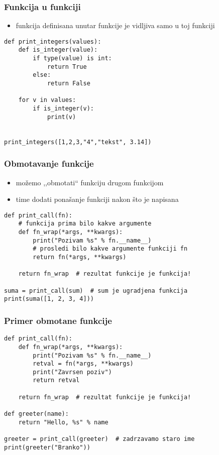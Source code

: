 \documentclass[utf8,compress,aspectratio=169]{beamer}
\begin{document}
\begin{frame}[fragile]
  \frametitle{Funkcija u funkciji}
  \begin{itemize}
    \item funkcija definisana unutar funkcije je vidljiva samo u toj funkciji
  \end{itemize}
\begin{verbatim}
def print_integers(values):
    def is_integer(value):
        if type(value) is int:
            return True
        else:
            return False

    for v in values:
        if is_integer(v):
            print(v)


print_integers([1,2,3,"4","tekst", 3.14])
\end{verbatim}
\end{frame}

\begin{frame}[fragile]
  \frametitle{Obmotavanje funkcije}
  \begin{itemize}
    \item možemo ,,obmotati`` funkciju drugom funkcijom
    \item time dodati ponašanje funkciji nakon što je napisana
  \end{itemize}
\begin{verbatim}
def print_call(fn):
    # funkcija prima bilo kakve argumente
    def fn_wrap(*args, **kwargs):
        print("Pozivam %s" % fn.__name__)
        # prosledi bilo kakve argumente funkciji fn
        return fn(*args, **kwargs)

    return fn_wrap  # rezultat funkcije je funkcija!

suma = print_call(sum)  # sum je ugradjena funkcija
print(suma([1, 2, 3, 4]))
\end{verbatim}
\end{frame}

\begin{frame}[fragile]
  \frametitle{Primer obmotane funkcije}
\begin{verbatim}
def print_call(fn):
    def fn_wrap(*args, **kwargs):
        print("Pozivam %s" % fn.__name__)
        retval = fn(*args, **kwargs)
        print("Zavrsen poziv")
        return retval

    return fn_wrap  # rezultat funkcije je funkcija!

def greeter(name):
    return "Hello, %s" % name

greeter = print_call(greeter)  # zadrzavamo staro ime
print(greeter("Branko"))
\end{verbatim}
\end{frame}
\end{document}
